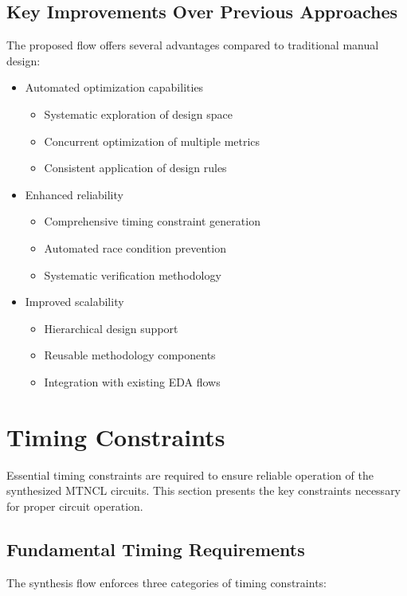 \documentclass[conference]{IEEEtran}
\begin{document}
\subsection{Key Improvements Over Previous Approaches}
The proposed flow offers several advantages compared to traditional manual design:

\begin{itemize}
\item Automated optimization capabilities
  \begin{itemize}
  \item Systematic exploration of design space
  \item Concurrent optimization of multiple metrics
  \item Consistent application of design rules
  \end{itemize}
\item Enhanced reliability
  \begin{itemize}
  \item Comprehensive timing constraint generation
  \item Automated race condition prevention
  \item Systematic verification methodology
  \end{itemize}
\item Improved scalability
  \begin{itemize}
  \item Hierarchical design support
  \item Reusable methodology components
  \item Integration with existing EDA flows
  \end{itemize}
\end{itemize}

\section{Timing Constraints}
Essential timing constraints are required to ensure reliable operation of the synthesized MTNCL circuits. This section presents the key constraints necessary for proper circuit operation.

\subsection{Fundamental Timing Requirements}
The synthesis flow enforces three categories of timing constraints:
\end{document}

